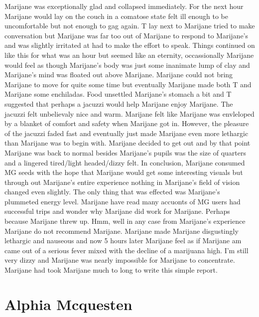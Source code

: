 \documentclass[12pt]{book}
\begin{document}
Marijane was exceptionally glad and collapsed immediately. For the next hour Marijane would lay on the couch in a comatose state felt ill enough to be uncomfortable but not enough to gag again. T lay next to Marijane tried to make conversation but Marijane was far too out of Marijane to respond to Marijane's and was slightly irritated at had to make the effort to speak. Things continued on like this for what was an hour but seemed like an eternity, occassionally Marijane would feel as though Marijane's body was just some inanimate lump of clay and Marijane's mind was floated out above Marijane. Marijane could not bring Marijane to move for quite some time but eventually Marijane made both T and Marijane some enchiladas. Food unsettled Marijane's stomach a bit and T suggested that perhaps a jacuzzi would help Marijane enjoy Marijane. The jacuzzi felt unbelievaly nice and warm. Marijane felt like Marijane was envleloped by a blanket of comfort and safety when Marijane got in. However, the pleasure of the jacuzzi faded fast and eventually just made Marijane even more lethargic than Marijane was to begin with. Marijane decided to get out and by that point Marijane was back to normal besides Marijane's pupils was the size of quarters and a lingered tired/light headed/dizzy felt. In conclusion, Marijane consumed MG seeds with the hope that Marijane would get some interesting visuals but through out Marijane's entire experience nothing in Marijane's field of vision changed even slightly. The only thing that was effected was Marijane's plummeted energy level. Marijane have read many accuonts of MG users had successful trips and wonder why Marijane did work for Marijane. Perhaps because Marijane threw up. Hmm, well in any case from Marijane's experience Marijane do not recommend Marijane. Marijane made Marijane disgustingly lethargic and nauseous and now 5 hours later Marijane feel as if Marijane am came out of a serious fever mixed with the decline of a marijuana high. I'm still very dizzy and Marijane was nearly impossible for Marijane to concentrate. Marijane had took Marijane much to long to write this simple report.



\chapter{Alphia Mcquesten}
\end{document}
